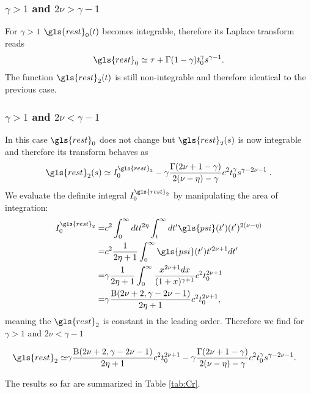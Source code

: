 \subsubsection{$\gamma>1$ and $2\nu>\gamma-1$}
For $\gamma>1$ $\gls{rest}_0(t)$ becomes integrable, therefore its Laplace transform reads
\begin{equation}
 \gls{rest}_0 \simeq \tau + \Gamma(1-\gamma) t_0^\gamma s^{\gamma-1} .
\end{equation}
The function $\gls{rest}_2(t)$ is still non-integrable and therefore identical to the previous case.

\subsubsection{$\gamma>1$ and $2\nu<\gamma-1$}
In this case $\gls{rest}_0$ does not change but $\gls{rest}_2(s)$ is now integrable and therefore its transform behaves as
\begin{equation}
\gls{rest}_2(s) \simeq I^{\gls{rest}_2}_0 - \gamma \frac{\Gamma(2\nu+1-\gamma)}{2(\nu-\eta)-\gamma} c^2 t_0^\gamma s^{\gamma - 2\nu-1 } \; .
\end{equation}
We evaluate the definite integral $I^{\gls{rest}_2}_0$ by manipulating the area of integration:
\begin{align}
 I^{\gls{rest}_2}_0 =& c^2\int_0^\infty dt  t^{2\eta} \int_t^\infty dt' \gls{psi}(t') (t')^{2(\nu-\eta)} \\
  =& c^2\frac{1}{2\eta+1} \int_0^\infty \gls{psi}(t') t'^{2\nu+1} dt' \nonumber \\ 
 =& \gamma\frac{1}{2\eta+1} \int_0^\infty \frac{x^{2\nu+1}dx}{(1+x)^{\gamma+1}}c^2 t_0^{2\nu+1}  \nonumber \\
=& \gamma  \frac{\mathrm{B}(2\nu +2, \gamma - 2\nu -1)}{2\eta+1}  c^2 t_0^{2\nu+1} , 
\end{align}
meaning the $\gls{rest}_2$ is constant in the leading order. Therefore we find for $\gamma>1$ and $2\nu<\gamma-1$

\begin{align}
\gls{rest}_2 \simeq & \gamma \frac{\mathrm{B}(2\nu +2, \gamma - 2\nu -1)}{2\eta+1}  c^2 t_0^{2\nu+1}   -\gamma \frac{\Gamma(2\nu+1-\gamma)} {2(\nu-\eta)-\gamma} c^2 t_0^\gamma  s^{\gamma - 2\nu-1} .
\end{align}

The results so far are summarized in Table \ref{tab:Cr}.


